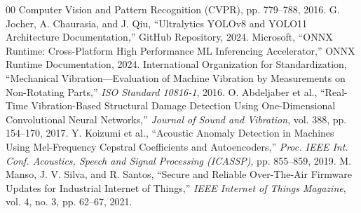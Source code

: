 \documentclass[conference]{IEEEtran}
\begin{document}
\begin{thebibliography}{00}
{    Computer Vision and Pattern Recognition (CVPR)}, pp. 779--788, 2016.
     G. Jocher, A. Chaurasia, and J. Qiu, ``Ultralytics YOLOv8 and YOLO11 Architecture Documentation,'' GitHub Repository, 2024.
     Microsoft, ``ONNX Runtime: Cross-Platform High Performance ML Inferencing Accelerator,'' ONNX Runtime Documentation, 2024.
     International Organization for Standardization, ``Mechanical Vibration---Evaluation of Machine Vibration by Measurements on Non-Rotating Parts,''
    \textit{ISO Standard 10816-1}, 2016.
     O. Abdeljaber et al., ``Real-Time Vibration-Based Structural Damage Detection Using One-Dimensional Convolutional Neural Networks,''
    \textit{Journal of Sound and Vibration}, vol. 388, pp. 154--170, 2017.
     Y. Koizumi et al., ``Acoustic Anomaly Detection in Machines Using Mel-Frequency Cepstral Coefficients and Autoencoders,'' \textit{Proc. IEEE Int.
    Conf. Acoustics, Speech and Signal Processing (ICASSP)}, pp. 855--859, 2019.
     M. Manso, J. V. Silva, and R. Santos, ``Secure and Reliable Over-The-Air Firmware Updates for Industrial Internet of Things,'' \textit{IEEE
    Internet of Things Magazine}, vol. 4, no. 3, pp. 62--67, 2021.
    \end{thebibliography}

    
\end{document}
